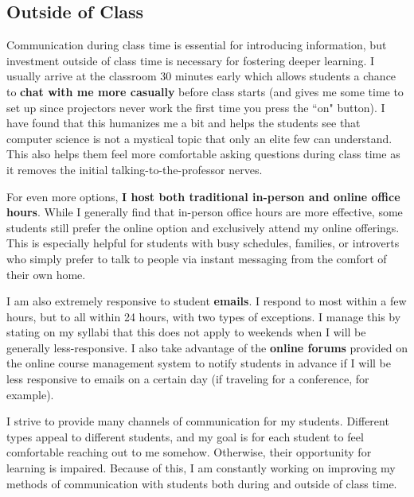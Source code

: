 \documentclass[12pt]{amsart} \usepackage{amssymb}
\begin{document}
\subsection*{Outside of Class}
Communication during class time is essential for introducing information, but investment outside of class time is necessary for fostering deeper learning. I usually arrive at the classroom 30 minutes early which allows students a chance to \textbf{chat with me more casually} before class starts (and gives me some time to set up since projectors never work the first time you press the ``on" button). I have found that this humanizes me a bit and helps the students see that computer science is not a mystical topic that only an elite few can understand. This also helps them feel more comfortable asking questions during class time as it removes the initial talking-to-the-professor nerves.

For even more options, \textbf{I host both traditional in-person and online office hours}. While I generally find that in-person office hours are more effective, some students still prefer the online option and exclusively attend my online offerings. This is especially helpful for students with busy schedules, families, or introverts who simply prefer to talk to people via instant messaging from the comfort of their own home.

I am also extremely responsive to student \textbf{emails}. I respond to most within a few hours, but to all within 24 hours, with two types of exceptions. I manage this by stating on my syllabi that this does not apply to weekends when I will be generally less-responsive. I also take advantage of the \textbf{online forums} provided on the online course management system to notify students in advance if I will be less responsive to emails on a certain day (if traveling for a conference, for example).

\vspace{1cm}
I strive to provide many channels of communication for my students. Different types appeal to   different students, and my goal is for each student to feel comfortable reaching out to me somehow. Otherwise, their opportunity for learning is impaired. Because of this, I am constantly working on improving my methods of communication with students both during and outside of class time.
\end{document}
